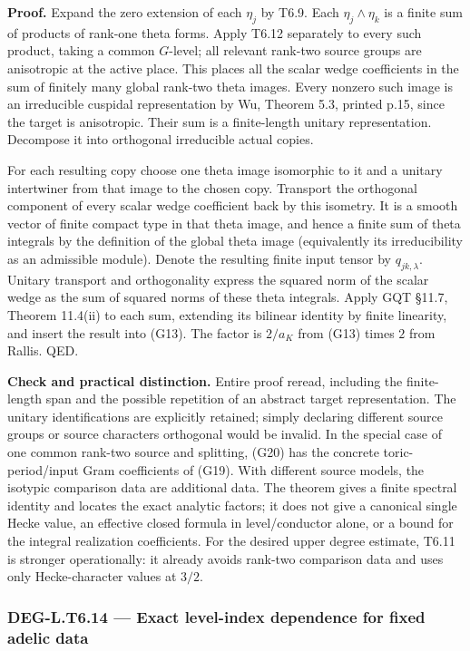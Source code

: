 \textbf{Proof.} Expand the zero extension of each \(\eta_j\) by T6.9. Each \(\eta_j\wedge\eta_k\) is a finite sum of products of rank-one theta forms. Apply T6.12 separately to every such product, taking a common \(G\)-level; all relevant rank-two source groups are anisotropic at the active place. This places all the scalar wedge coefficients in the sum of finitely many global rank-two theta images. Every nonzero such image is an irreducible cuspidal representation by Wu, Theorem 5.3, printed p.15, since the target is anisotropic. Their sum is a finite-length unitary representation. Decompose it into orthogonal irreducible actual copies.

For each resulting copy choose one theta image isomorphic to it and a unitary intertwiner from that image to the chosen copy. Transport the orthogonal component of every scalar wedge coefficient back by this isometry. It is a smooth vector of finite compact type in that theta image, and hence a finite sum of theta integrals by the definition of the global theta image (equivalently its irreducibility as an admissible module). Denote the resulting finite input tensor by \(q_{jk,\lambda}\). Unitary transport and orthogonality express the squared norm of the scalar wedge as the sum of squared norms of these theta integrals. Apply GQT §11.7, Theorem 11.4(ii) to each sum, extending its bilinear identity by finite linearity, and insert the result into (G13). The factor is \(2/a_K\) from (G13) times \(2\) from Rallis. QED.

\textbf{Check and practical distinction.} Entire proof reread, including the finite-length span and the possible repetition of an abstract target representation. The unitary identifications are explicitly retained; simply declaring different source groups or source characters orthogonal would be invalid. In the special case of one common rank-two source and splitting, (G20) has the concrete toric-period/input Gram coefficients of (G19). With different source models, the isotypic comparison data are additional data. The theorem gives a finite spectral identity and locates the exact analytic factors; it does not give a canonical single Hecke value, an effective closed formula in level/conductor alone, or a bound for the integral realization coefficients. For the desired upper degree estimate, T6.11 is stronger operationally: it already avoids rank-two comparison data and uses only Hecke-character values at \(3/2\).

\subsubsection{DEG-L.T6.14 --- Exact level-index dependence for fixed adelic data}\label{DEG-L.T6.14}

